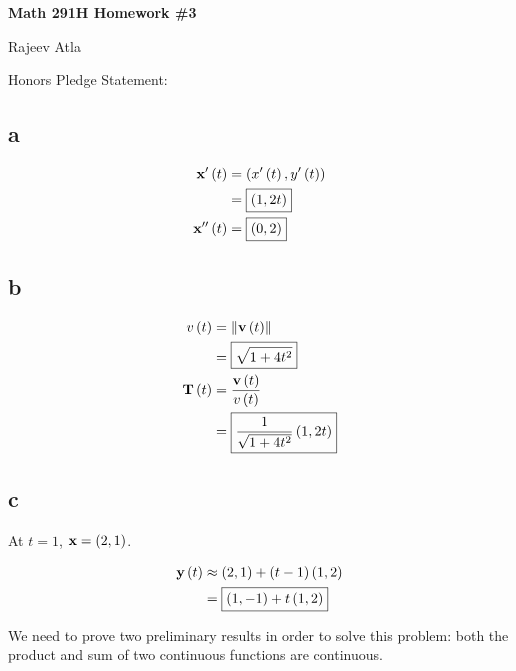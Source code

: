 \documentclass{article}
\begin{document}
\begin{center}
    \Large \textbf{Math 291H Homework \#3}
  \end{center}
\begin{center}
    \Large Rajeev Atla
  \end{center}


  
Honors Pledge Statement: 


\subsection*{a}

\begin{align*}
  \textbf{x}' \left ( t \right) &= \left ( x' \left ( t \right), y' \left ( t \right) \right) \\
                   &= \boxed{\left ( 1, 2t \right)} \\
  \textbf{x}'' \left ( t \right) &= \boxed{\left ( 0, 2 \right)} \\
\end{align*}

\subsection*{b}

\begin{align*}
  v \left ( t \right) &= \left\lVert\textbf{v} \left ( t \right)\right\rVert \\
             &= \boxed{\sqrt{1 + 4t^2}} \\
  \textbf{T} \left ( t \right) &= \frac{\textbf{v} \left ( t \right)}{v \left ( t \right)} \\
  &= \boxed{\frac{1}{\sqrt{1 + 4t^2}} \left ( 1, 2t \right) } \\
\end{align*}


\subsection*{c}
At $t=1$, $\textbf{x} = \left ( 2, 1 \right)$.

\begin{align*}
  \textbf{y} \left ( t \right) & \approx \left ( 2, 1 \right) + \left ( t-1 \right) \left ( 1, 2 \right) \\
  &= \boxed{\left ( 1, -1 \right) + t \left ( 1, 2 \right)} \\
\end{align*}


We need to prove two preliminary results in order to solve this problem: both the product and sum of two continuous functions are continuous.
\end{document}
